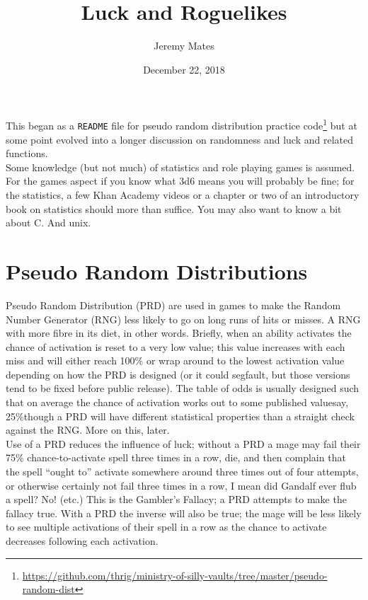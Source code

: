\documentclass[12pt,a4paper]{article}
\title{Luck and Roguelikes}
\author{Jeremy Mates}
\date{December 22, 2018}
\begin{document}
\maketitle

\setlength{\parindent}{0pt}

This began as a \texttt{README} file for pseudo random distribution
practice
code\footnote{\url{https://github.com/thrig/ministry-of-silly-vaults/tree/master/pseudo-random-dist}}
but at some point evolved into a longer discussion on randomness and
luck and related functions. \\

Some knowledge (but not much) of statistics and role playing games is
assumed. For the games aspect if you know what 3d6 means you will
probably be fine; for the statistics, a few Khan Academy videos or a
chapter or two of an introductory book on statistics should more than
suffice. You may also want to know a bit about C. And unix.

\section*{Pseudo Random Distributions}

Pseudo Random Distribution (PRD) are used in games to make the Random
Number Generator (RNG) less likely to go on long runs of hits or misses.
A RNG with more fibre in its diet, in other words. Briefly, when an
ability activates the chance of activation is reset to a very low value;
this value increases with each miss and will either reach 100\% or wrap
around to the lowest activation value depending on how the PRD is
designed (or it could segfault, but those versions tend to be fixed
before public release). The table of odds is usually designed such that
on average the chance of activation works out to some published
value\textendash say, 25\%\textendash though a PRD will have different
statistical properties than a straight check against the RNG. More on
this, later. \\

Use of a PRD reduces the influence of luck; without a PRD a mage may
fail their 75\% chance-to-activate spell three times in a row, die, and
then complain that the spell ``ought to'' activate somewhere around
three times out of four attempts, or otherwise certainly not fail three
times in a row, I mean did Gandalf ever flub a spell? No!
(etc.) This is the Gambler's Fallacy; a PRD attempts to make
the fallacy true. With a PRD the inverse will also be true; the mage
will be less likely to see multiple activations of their spell in a row
as the chance to activate decreases following each activation. \\
\end{document}
